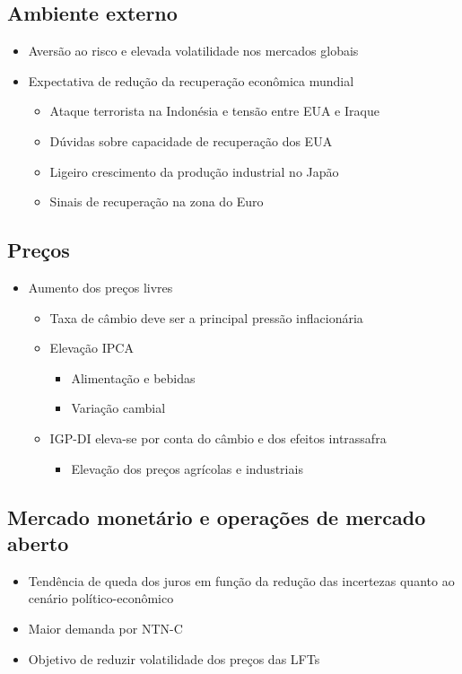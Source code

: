 \documentclass[11pt]{article}
\begin{document}
\subsection*{Ambiente externo}
\label{sec:orgd7a26f6}
\begin{itemize}
\item Aversão ao risco e elevada volatilidade nos mercados globais
\item Expectativa de redução da recuperação econômica mundial
\begin{itemize}
\item Ataque terrorista na Indonésia e tensão entre EUA e Iraque
\item Dúvidas sobre capacidade de recuperação dos EUA
\item Ligeiro crescimento da produção industrial no Japão
\item Sinais de recuperação na zona do Euro
\end{itemize}
\end{itemize}
\subsection*{Preços}
\label{sec:org70c56f2}
\begin{itemize}
\item Aumento dos preços livres
\begin{itemize}
\item Taxa de câmbio deve ser a principal pressão inflacionária
\item Elevação IPCA
\begin{itemize}
\item Alimentação e bebidas
\item Variação cambial
\end{itemize}
\item IGP-DI eleva-se por conta do câmbio e dos efeitos intrassafra
\begin{itemize}
\item Elevação dos preços agrícolas e industriais
\end{itemize}
\end{itemize}
\end{itemize}
\subsection*{Mercado monetário e operações de mercado aberto}
\label{sec:orgc8288aa}
\begin{itemize}
\item Tendência de queda dos juros em função da redução das incertezas quanto ao cenário político-econômico
\item Maior demanda por NTN-C
\item Objetivo de reduzir volatilidade dos preços das LFTs
\end{itemize}
\end{document}
